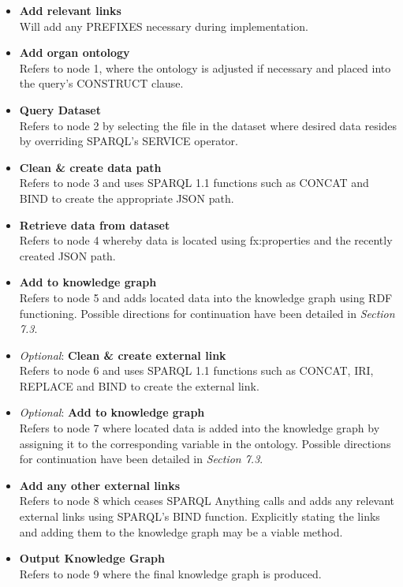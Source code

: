 \begin{itemize}
    \item \textbf{Add relevant links} \\ Will add any PREFIXES necessary during implementation. 
    \item \textbf{Add organ ontology} \\  Refers to node 1, where the ontology is adjusted if necessary and placed into the query's CONSTRUCT clause. 
    \item \textbf{Query Dataset} \\ Refers to node 2 by selecting the file in the dataset where desired data resides by overriding SPARQL's SERVICE operator.
    \item \textbf{Clean \& create data path} \\ Refers to node 3 and uses SPARQL 1.1 functions such as CONCAT and BIND to create the appropriate JSON path. 
    \item \textbf{Retrieve data from dataset} \\ Refers to node 4 whereby data is located using fx:properties and the recently created JSON path. 
    \item \textbf{Add to knowledge graph} \\ Refers to node 5 and adds located data into the knowledge graph using RDF functioning. Possible directions for continuation have been detailed in \textit{Section 7.3}.
    \item \textit{Optional}: \textbf{Clean \& create external link} \\ Refers to node 6 and uses SPARQL 1.1 functions such as CONCAT, IRI, REPLACE and BIND to create the external link.
    \item  \textit{Optional}: \textbf{Add to knowledge graph} \\ Refers to node 7 where located data is added into the knowledge graph by assigning it to the corresponding variable in the ontology. Possible directions for continuation have been detailed in \textit{Section 7.3}.
    \item \textbf{Add any other external links} \\ Refers to node 8 which ceases SPARQL Anything calls and adds any relevant external links using SPARQL's BIND function. Explicitly stating the links and adding them to the knowledge graph may be a viable method. 
    \item \textbf{Output Knowledge Graph} \\ Refers to node 9 where the final knowledge graph is produced. 
\end{itemize}
